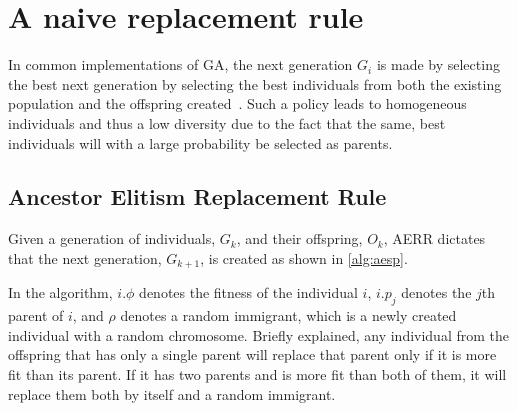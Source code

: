 \section{A naive replacement rule}
In common implementations of GA, the next generation $G_{i}$ is made by selecting the best  next generation by selecting the best individuals from both the existing population and the offspring created~. Such a policy leads to homogeneous individuals and thus a low diversity due to the fact that the same, best individuals will with a large probability be selected as parents.

\subsection{Ancestor Elitism Replacement Rule}
Given a generation of individuals, $G_k$, and their offspring, $O_k$, AERR dictates that the next generation, $G_{k+1}$, is created as shown in \cref{alg:aesp}.
%

%
In the algorithm, $i.\phi$ denotes the fitness of the individual $i$, $i.p_j$ denotes the $j$th parent of $i$, and $\rho$ denotes a random immigrant, which is a newly created individual with a random chromosome.
Briefly explained, any individual from the offspring that has only a single parent will replace that parent only if it is more fit than its parent. If it has two parents and is more fit than both of them, it will replace them both by itself and a random immigrant.
